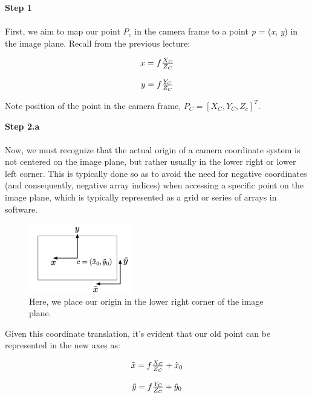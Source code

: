 \documentclass[]{article}
\begin{document}
	\textbf{Step 1}\\\\
	First, we aim to map our point $P_c$ in the camera frame to a point \textit{p} = (\textit{x}, \textit{y}) in the image plane. Recall from the previous lecture:
	
	\begin{center}
		\begin{equation}
		\begin{tabular}{c}
		$x = f\frac{X_C}{Z_C}$\\
		\\
		$y = f\frac{Y_C}{Z_C}$
		\end{tabular}
		\end{equation}
	\end{center}
	
	Note position of the point in the camera frame, $P_C = [X_C,  Y_C,  Z_c]^T$.
	
	\textbf{Step 2.a}\\\\
	Now, we must recognize that the actual origin of a camera coordinate system is not centered on the image plane, but rather usually in the lower right or lower left corner. This is typically done so as to avoid the need for negative coordinates (and consequently, negative array indices) when accessing a specific point on the image plane, which is typically represented as a grid or series of arrays in software.
	
	\begin{figure}[H]
		\includegraphics[width=0.4\textwidth]{vik_image_2.png}
		\centering
		\caption{Here, we place our origin in the lower right corner of the image plane. }
		\label{fig:camera_coordinates}
	\end{figure}
	
	Given this coordinate translation, it's evident that our old point can be represented in the new axes as:
	
	\begin{center}
		\begin{equation}
		\begin{tabular}{c}
		$\tilde{x} = f\frac{X_C}{Z_C} + \tilde{x}_0$\\
		\\
		$\tilde{y} = f\frac{Y_C}{Z_C} + \tilde{y}_0$
		\end{tabular}
		\end{equation}
	\end{center}
	
\end{document}
